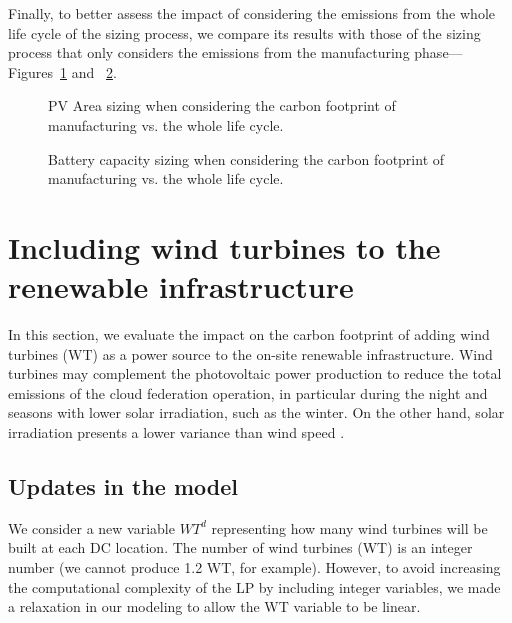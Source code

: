 Finally, to better assess the impact of considering the emissions from the whole life cycle of the sizing process, we compare its results with those of the sizing process that only considers the emissions from the manufacturing phase---Figures~\ref{fig:pv_lca} and ~\ref{fig:bat_lca}.


\begin{figure}[H]
  \centering
  {}
  \caption{PV Area sizing when considering the carbon footprint of manufacturing vs. the whole life cycle. }
  \label{fig:pv_lca}
\end{figure}


\begin{figure}[H]
  \centering
  {}
  \caption{Battery capacity sizing when considering the carbon footprint of manufacturing vs. the whole life cycle.  }
  \label{fig:bat_lca}
\end{figure}



\section{Including wind turbines to the renewable infrastructure}
\label{sec:add_wt}


In this section, we evaluate the impact on the carbon footprint of adding wind turbines (WT) as a power source to the on-site renewable infrastructure. Wind turbines may complement the photovoltaic power production to reduce the total emissions of the cloud federation operation, in particular during the night and seasons with lower solar irradiation, such as the winter. On the other hand, solar irradiation presents a lower variance than wind speed \cite{krakauer2017prediction_accuracy}.

\subsection{Updates in the model}
\label{sec:ex_model_wt}

We consider a new variable $WT^d$ representing how many wind turbines will be built at each DC location. The number of wind turbines (WT) is an integer number (we cannot produce 1.2 WT, for example). However, to avoid increasing the computational complexity of the LP by including integer variables, we made a relaxation in our modeling to allow the WT variable to be linear. 

